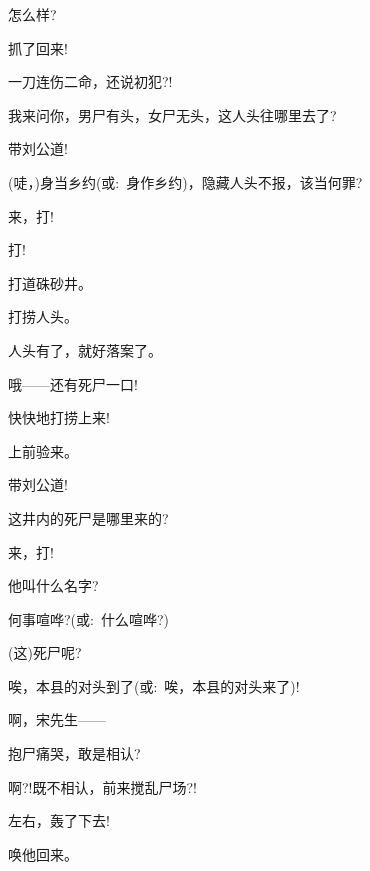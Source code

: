 {{怎么样?}\hspace{30pt}~

{抓了回来!}\hspace{30pt}~

{一刀连伤二命，还说初犯?!}

{我来问你，男尸有头，女尸无头，这人头往哪里去了?}

{带刘公道!}\hspace{30pt}~

{(唗，)身当乡约({\akai 或}:~身作乡约)，隐藏人头不报，该当何罪?}

{来，打!}\hspace{30pt}~

{打!}\hspace{40pt}~

{打道硃砂井。}\hspace{30pt}~

{打捞人头。}\hspace{30pt}~

{人头有了，就好落案了。}\hspace{10pt}~

{哦------还有死尸一口!}

{快快地打捞上来!}\hspace{20pt}~

{上前验来。}\hspace{30pt}~

{带刘公道!}\hspace{30pt}~

{这井内的死尸是哪里来的?}\hspace{10pt}~

{来，打!}\hspace{30pt}~

{他叫什么名字?}\hspace{20pt}~

{何事喧哗?({\akai 或}:~什么喧哗?)}

{(这)死尸呢?}\hspace{20pt}~

{唉，本县的对头到了({\akai 或}:~唉，本县的对头来了)!}

{啊，宋先生------}\hspace{10pt}~

{抱尸痛哭，敢是相认?}\hspace{10pt}~

{啊?!既不相认，前来搅乱尸场?!}

{左右，轰了下去!}\hspace{20pt}~

{唤他回来。}\hspace{30pt}~

}
